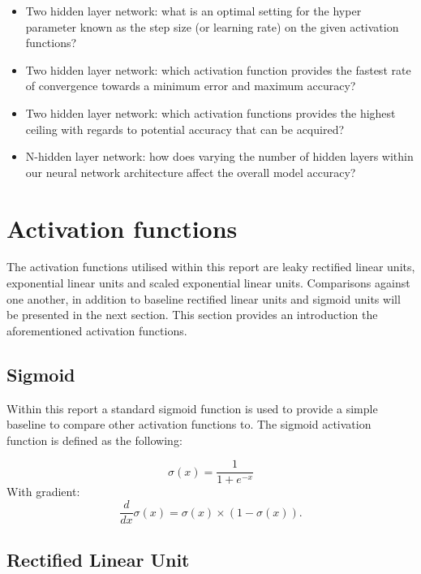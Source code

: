 \documentclass{article}
\begin{document}
\begin{itemize}
  \item Two hidden layer network: what is an optimal setting for the hyper parameter known as the step size (or learning rate) on the given activation functions?
  \item Two hidden layer network: which activation function provides the fastest rate of convergence towards a minimum error and maximum accuracy?
  \item Two hidden layer network: which activation functions provides the highest ceiling with regards to potential accuracy that can be acquired?
  \item N-hidden layer network: how does varying the number of hidden layers within our neural network architecture affect the overall model accuracy?
\end{itemize}

\section{Activation functions}
\label{sec:actfn}
The activation functions utilised within this report are leaky rectified linear units, exponential linear units\citep{clevert2015fast} and scaled exponential linear units\citep{klambauer2017self}. Comparisons against one another, in addition to baseline rectified linear units and sigmoid units will be presented in the next section. This section provides an introduction the aforementioned activation functions.

\subsection{Sigmoid}

Within this report a standard sigmoid function is used to provide a simple baseline to compare other activation functions to. The sigmoid activation function is defined as the following:

\begin{equation}
  \sigma(x) = \frac{1}{1+e^{-x}}
\end{equation}
With gradient:
\begin{equation}
  \frac{d}{dx} \sigma(x) = \sigma(x) \times (1-\sigma(x)).
\end{equation}

\subsection{Rectified Linear Unit}
\end{document}
